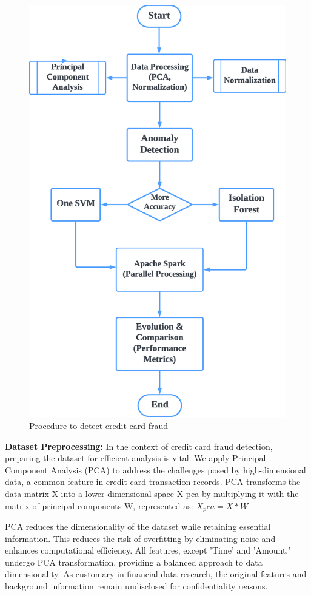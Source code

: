 \documentclass[journal]{IEEEtran}
\begin{document}
\begin{figure}[h]
  \centering
  \includegraphics[width=0.7\linewidth]{vertical.eps}
  \caption{Procedure to detect credit card fraud}
  \label{fig:flowchart}
\end{figure}


\textbf{Dataset Preprocessing:} 
In the context of credit card fraud detection, preparing the dataset for efficient analysis is vital. We apply Principal Component Analysis (PCA) to address the challenges posed by high-dimensional data, a common feature in credit card transaction records. PCA transforms the data matrix X into a lower-dimensional space X pca by multiplying it with the matrix of principal components W, represented as:  \(X_pca = X * W\)

PCA reduces the dimensionality of the dataset while retaining essential information. This reduces the risk of overfitting by eliminating noise and enhances computational efficiency. All features, except 'Time' and 'Amount,' undergo PCA transformation, providing a balanced approach to data dimensionality.
As customary in financial data research, the original features and background information remain undisclosed for confidentiality reasons. 
\end{document}

